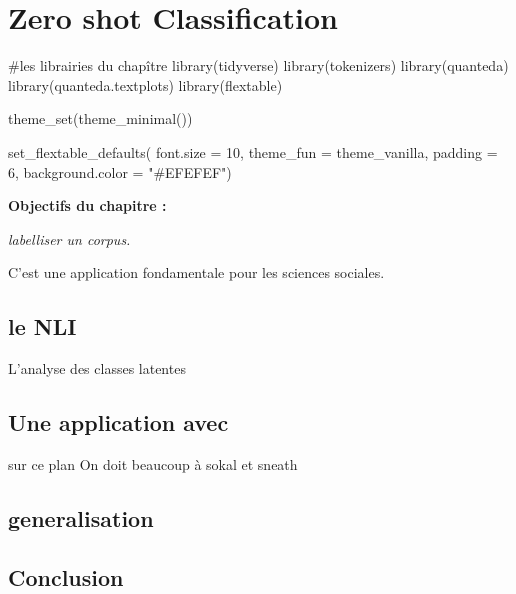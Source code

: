 \documentclass[
  letterpaper,
  DIV=11,
  numbers=noendperiod]{scrreprt}
\newenvironment{Shaded}{\begin{snugshade}}{\end{snugshade}}
\newcommand{\AttributeTok}[1]{\textcolor[rgb]{0.40,0.45,0.13}{#1}}
\newcommand{\CommentTok}[1]{\textcolor[rgb]{0.37,0.37,0.37}{#1}}
\newcommand{\DecValTok}[1]{\textcolor[rgb]{0.68,0.00,0.00}{#1}}
\newcommand{\FunctionTok}[1]{\textcolor[rgb]{0.28,0.35,0.67}{#1}}
\newcommand{\NormalTok}[1]{\textcolor[rgb]{0.00,0.23,0.31}{#1}}
\newcommand{\StringTok}[1]{\textcolor[rgb]{0.13,0.47,0.30}{#1}}
\begin{document}

\chapter{Zero shot Classification}\label{zero-shot-classification}

\begin{Shaded}
\begin{Highlighting}[]
\CommentTok{\#les librairies du chapître}
\FunctionTok{library}\NormalTok{(tidyverse)}
\FunctionTok{library}\NormalTok{(tokenizers)}
\FunctionTok{library}\NormalTok{(quanteda)}
\FunctionTok{library}\NormalTok{(quanteda.textplots)}
\FunctionTok{library}\NormalTok{(flextable)}

\FunctionTok{theme\_set}\NormalTok{(}\FunctionTok{theme\_minimal}\NormalTok{()) }

\FunctionTok{set\_flextable\_defaults}\NormalTok{(}
  \AttributeTok{font.size =} \DecValTok{10}\NormalTok{, }\AttributeTok{theme\_fun =}\NormalTok{ theme\_vanilla,}
  \AttributeTok{padding =} \DecValTok{6}\NormalTok{,}
  \AttributeTok{background.color =} \StringTok{"\#EFEFEF"}\NormalTok{)}
\end{Highlighting}
\end{Shaded}

\textbf{Objectifs du chapitre :}

\emph{labelliser un corpus.}

C'est une application fondamentale pour les sciences sociales.

\section{le NLI}\label{le-nli}

L'analyse des classes latentes

\section{Une application avec}\label{une-application-avec}

sur ce plan On doit beaucoup à sokal et sneath

\section{generalisation}\label{generalisation}

\section{Conclusion}\label{conclusion-14}
\end{document}
